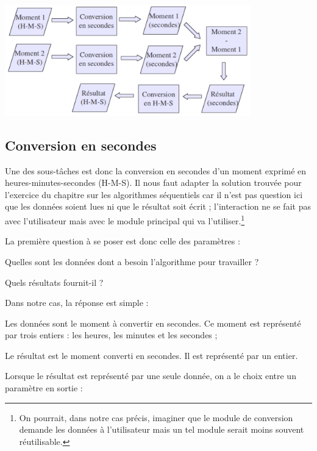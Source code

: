 	\begin{center}
	\includegraphics[width=0.8\textwidth]{image/module-conversion}
	\end{center}

\subsection*{Conversion en secondes}

	Une des sous-tâches est donc la conversion en secondes
	d'un moment exprimé en heures-minutes-secondes
	(H-M-S). Il nous faut adapter la solution trouvée pour
	l'exercice du chapitre sur les algorithmes séquentiels
	car il n'est pas question ici que les données soient
	lues ni que le résultat soit écrit ; l'interaction ne
	se fait pas avec l'utilisateur mais avec le module
	principal qui va l'utiliser.\footnote{On pourrait,
	dans notre cas précis, imaginer que le module de conversion demande les
	données à l'utilisateur mais un tel module serait
	moins souvent réutilisable.}

	La première question à se poser est donc celle des paramètres :

	\begin{liste}
	\item 
		Quelles sont les données dont a besoin l'algorithme
		pour travailler ?
	\item 
		Quels résultats fournit-il ?
	\end{liste}

	Dans notre cas, la réponse est simple :

	\begin{liste}
	\item {
		Les données sont le moment à convertir en secondes. Ce moment est
		représenté par trois entiers : les heures, les minutes et les secondes
		;}
	\item {
		Le résultat est le moment converti en secondes. Il est représenté par un
		entier.}
	\end{liste}

	Lorsque le résultat est représenté par une seule donnée, on a le choix
	entre un paramètre en sortie :

